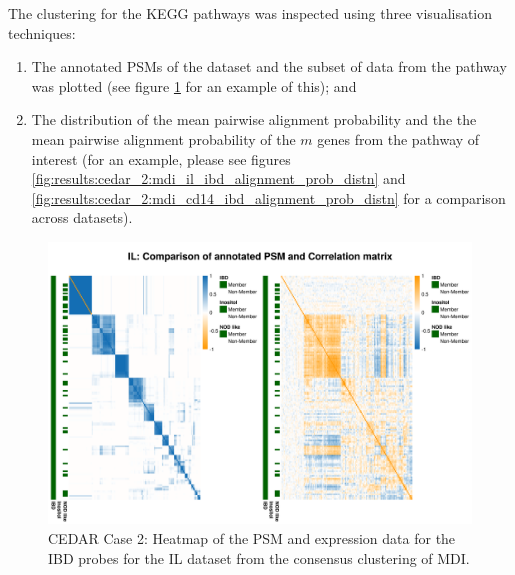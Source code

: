 \documentclass[12pt]{article} %
\begin{document}

	The clustering for the KEGG pathways was inspected using three visualisation techniques:
	\begin{enumerate}
		\item The annotated PSMs of the dataset and the subset of data from the pathway was plotted (see figure \ref{fig:results:cedar_2:mdi_il_ibd_psm_cor} for an example of this); and
		\item The distribution of the mean pairwise alignment probability and the the mean pairwise alignment probability of the $m$ genes from the pathway of interest (for an example, please see figures \ref{fig:results:cedar_2:mdi_il_ibd_alignment_prob_distn} and \ref{fig:results:cedar_2:mdi_cd14_ibd_alignment_prob_distn} for a comparison across datasets).
	\end{enumerate}
	
	\begin{figure}
		\centering
		\includegraphics[scale=0.75]{Images/Biology_data/Set_1000/All_datasets/Heatmaps/KEGG_INFLAMMATORY_BOWEL_DISEASE/IL_comp_psm_corr.png}
		\caption{CEDAR Case 2: Heatmap of the PSM and expression data for the IBD probes for the IL dataset from the consensus clustering of MDI.}
		\label{fig:results:cedar_2:mdi_il_ibd_psm_cor}
	\end{figure}
	
\end{document}
